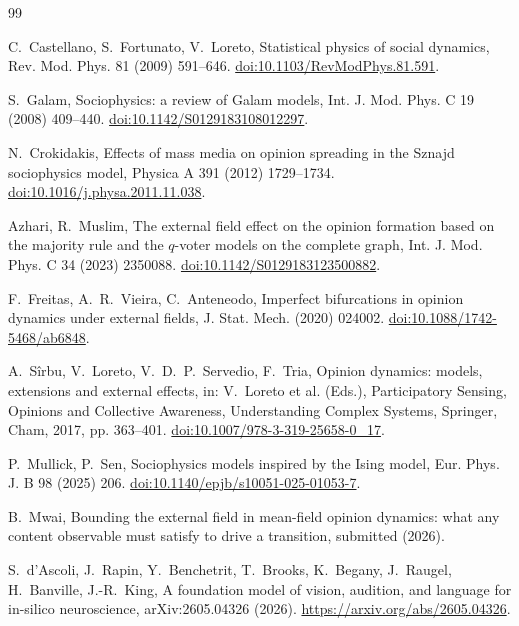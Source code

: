 \documentclass[preprint,12pt]{elsarticle}
\begin{document}
\begin{thebibliography}{99}

C.~Castellano, S.~Fortunato, V.~Loreto,
Statistical physics of social dynamics,
Rev. Mod. Phys. 81 (2009) 591--646.
\href{https://doi.org/10.1103/RevModPhys.81.591}{doi:10.1103/RevModPhys.81.591}.

S.~Galam,
Sociophysics: a review of Galam models,
Int. J. Mod. Phys. C 19 (2008) 409--440.
\href{https://doi.org/10.1142/S0129183108012297}{doi:10.1142/S0129183108012297}.

N.~Crokidakis,
Effects of mass media on opinion spreading in the Sznajd sociophysics model,
Physica A 391 (2012) 1729--1734.
\href{https://doi.org/10.1016/j.physa.2011.11.038}{doi:10.1016/j.physa.2011.11.038}.

Azhari, R.~Muslim,
The external field effect on the opinion formation based on the majority rule and the
$q$-voter models on the complete graph,
Int. J. Mod. Phys. C 34 (2023) 2350088.
\href{https://doi.org/10.1142/S0129183123500882}{doi:10.1142/S0129183123500882}.

F.~Freitas, A.~R.~Vieira, C.~Anteneodo,
Imperfect bifurcations in opinion dynamics under external fields,
J. Stat. Mech. (2020) 024002.
\href{https://doi.org/10.1088/1742-5468/ab6848}{doi:10.1088/1742-5468/ab6848}.

A.~S\^{i}rbu, V.~Loreto, V.~D.~P.~Servedio, F.~Tria,
Opinion dynamics: models, extensions and external effects,
in: V.~Loreto et al. (Eds.), Participatory Sensing, Opinions and Collective Awareness,
Understanding Complex Systems, Springer, Cham, 2017, pp. 363--401.
\href{https://doi.org/10.1007/978-3-319-25658-0_17}{doi:10.1007/978-3-319-25658-0\_17}.

P.~Mullick, P.~Sen,
Sociophysics models inspired by the Ising model,
Eur. Phys. J. B 98 (2025) 206.
\href{https://doi.org/10.1140/epjb/s10051-025-01053-7}{doi:10.1140/epjb/s10051-025-01053-7}.

B.~Mwai,
Bounding the external field in mean-field opinion dynamics: what any content observable must
satisfy to drive a transition, submitted (2026).

S.~d'Ascoli, J.~Rapin, Y.~Benchetrit, T.~Brooks, K.~Begany, J.~Raugel, H.~Banville,
J.-R.~King,
A foundation model of vision, audition, and language for in-silico neuroscience,
arXiv:2605.04326 (2026). \url{https://arxiv.org/abs/2605.04326}.


\end{thebibliography}
\end{document}
